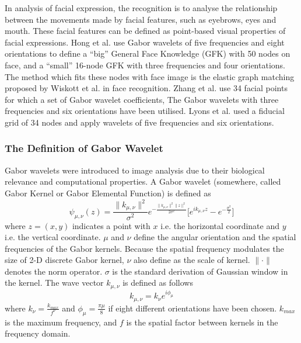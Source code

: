 In analysis of facial expression, the recognition is to analyse the relationship between the movements made by facial features, such as eyebrows, eyes and mouth. These facial features can be defined as point-based visual properties of facial expressions. Hong et al.\cite{Hong1998} use Gabor wavelets of five frequencies and eight orientations to define a ``big'' General Face Knowledge (GFK) with 50 nodes on face, and a ``small'' 16-node GFK with three frequencies and four orientations. The method which fits these nodes with face image is the elastic graph matching proposed by Wiskott et al.\cite{Wiskott1997,Wiskott1999} in face recognition. Zhang et al.\cite{Zhang1998} use 34 facial points for which a set of Gabor wavelet coefficients, The Gabor wavelets with three frequencies and six orientations have been utilised. Lyons et al.\cite{Lyons1999} used a fiducial grid of 34 nodes and apply wavelets of five frequencies and six orientations.
\subsubsection{The Definition of Gabor Wavelet}
Gabor wavelets were introduced to image analysis due to their biological relevance and computational properties. A Gabor wavelet \cite{Daugman1988} (somewhere, called Gabor Kernel or Gabor Elemental Function\cite{Dunn1994}) is defined as 
\begin{equation}\label{eq:kernel}
   \psi_{\mu,\nu}(z)=\frac{\|{k_{\mu,\nu}}\| ^ {2}}{\sigma ^{2}}e^{-\frac{\|{k_{\mu,\nu}}\|^ {2}\|z\|^{2}}{2\sigma ^{2}}}\lbrack{e^{ik_{\mu,\nu} z}-e^{-\frac{\sigma^2}{2}}}\rbrack
\end{equation}
where $z=(x,y)$ indicates a point with $x$ i.e. the horizontal coordinate and $y$ i.e. the vertical coordinate. $\mu$ and $\nu$ define the angular orientation and the spatial frequencies of the Gabor kernels. Because the spatial frequency modulates the size of 2-D discrete Gabor kernel, $\nu$ also define as the scale of kernel. $\|\cdot\|$ denotes the norm operator. $\sigma$ is the standard derivation of Gaussian window in the kernel. The wave vector $k_{\mu,\nu}$ is defined as follows
\begin{equation}\label{eq:wavevector}
k_{\mu,\nu}=k_{\nu}e^{i\phi_{\mu}}
\end{equation}
where $k_{\nu}=\frac{k_{max}}{f^{\nu}}$ and $\phi_{\mu}=\frac{\pi\mu}{8}$ if eight different orientations have been chosen. $k_{max}$ is the maximum frequency, and $f$ is the spatial factor between
kernels in the frequency domain.
